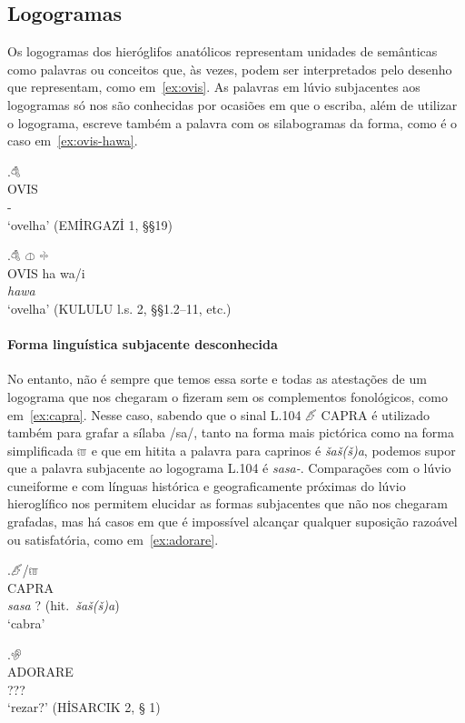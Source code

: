 \subsection{Logogramas}

Os logogramas dos hieróglifos anatólicos representam unidades de semânticas
como palavras ou conceitos que, às vezes, podem ser interpretados pelo
desenho que representam, como em~\ref{ex:ovis}.
As palavras em lúvio subjacentes aos logogramas só nos são conhecidas por
ocasiões em que o escriba, além de utilizar o logograma, escreve também a
palavra com os silabogramas da forma, como é o caso em~\ref{ex:ovis-hawa}.

\exg.\label{ex:ovis}\Large 𔒇\\
OVIS\\
-\\
`ovelha' (EMİRGAZİ 1, §§19)

\exg.\label{ex:ovis-hawa}\Large 𔒇 \Large 𔓷 \Large 𔗬\\
OVIS ha wa/i\\
\emph{hawa}\\
`ovelha' (KULULU l.s. 2, §§1.2–11, etc.)


\paragraph{Forma linguística subjacente desconhecida}
No entanto, não é sempre que temos essa sorte e todas as atestações de um
logograma que nos chegaram o fizeram sem os complementos fonológicos, como
em~\ref{ex:capra}. Nesse caso, sabendo que o sinal L.104 𔑶 CAPRA é utilizado
também para grafar a sílaba /sa/, tanto na forma mais pictórica como na forma
simplificada 𔑷 e que em hitita a palavra para caprinos é \emph{šaš{(š)}a}, podemos
supor que a palavra subjacente ao logograma L.104 é \emph{sasa-}.
Comparações com o lúvio cuneiforme e com línguas histórica e
geograficamente próximas do lúvio hieroglífico nos permitem elucidar as formas
subjacentes que não nos chegaram grafadas, mas há casos em que é impossível
alcançar qualquer suposição razoável ou satisfatória, como em~\ref{ex:adorare}.

\exg.\label{ex:capra}\Large 𔑶\slash{}𔑷\\
CAPRA\\
\emph{sasa}{ }? (hit.\ \emph{šaš{(š)}a})\\
`cabra'


\exg.\label{ex:adorare}\Large 𔐅  \\
ADORARE\\
???\\
`rezar?' (HİSARCIK 2, § 1)

